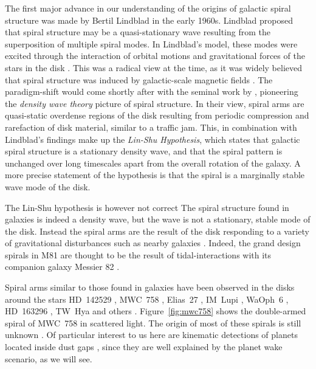 The first major advance in our understanding of the origins of galactic spiral structure was made by Bertil Lindblad in the early 1960s. 
Lindblad proposed that spiral structure may be a quasi-stationary wave resulting from the superposition of multiple spiral modes.
In Lindblad's model, these modes were excited through the interaction of orbital motions and gravitational forces of the stars in the disk \citep{lindblad1963}.
This was a radical view at the time, as it was widely believed that spiral structure was induced by galactic-scale magnetic fields \citep[e.g.][]{hoyle1961,oki1964}.
The paradigm-shift would come shortly after with the seminal work by \citet{lin1964}, pioneering the \textit{density wave theory} picture of spiral structure.
In their view, spiral arms are quasi-static overdense regions of the disk resulting from periodic compression and rarefaction of disk material, similar to a traffic jam.
This, in combination with Lindblad's findings make up the \textit{Lin-Shu Hypothesis}, which states that galactic spiral structure is a stationary density wave, and that the spiral pattern is unchanged over long timescales apart from the overall rotation of the galaxy.
A more precise statement of the hypothesis is that the spiral is a marginally stable wave mode of the disk.

The Lin-Shu hypothesis is however not correct \citep{toomre1969,dobbs2014}
The spiral structure found in galaxies is indeed a density wave, but the wave is not a stationary, stable mode of the disk.
Instead the spiral arms are the result of the disk responding to a variety of gravitational disturbances such as nearby galaxies \citep{goldreich1965,julian1966}.
Indeed, the grand design spirals in M81 are thought to be the result of tidal-interactions with its companion galaxy Messier 82 \citep{yun1999a}.

Spiral arms similar to those found in galaxies have been observed in the disks around the stars HD~142529 \citep{christiaens2014}, MWC~758 \citep{benisty2015}, Elias~27 \citep{perez2016,huang2018}, IM~Lupi \citep{avenhaus2018,huang2018}, WaOph~6 \citep{huang2018}, HD~163296 \citep{calcino2022}, TW~Hya \citep{teague2022} and others \citep[and references therin]{dong2018}.
Figure~\ref{fig:mwc758} shows the double-armed spiral of MWC~758 in scattered light.
The origin of most of these spirals is still unknown \citep[e.g.][]{zhang2018}.
Of particular interest to us here are kinematic detections of planets located inside dust gaps \citep{pinte2018a,pinte2019,pinte2020,teague2021,teague2022}, since they are well explained by the planet wake scenario, as we will see.

